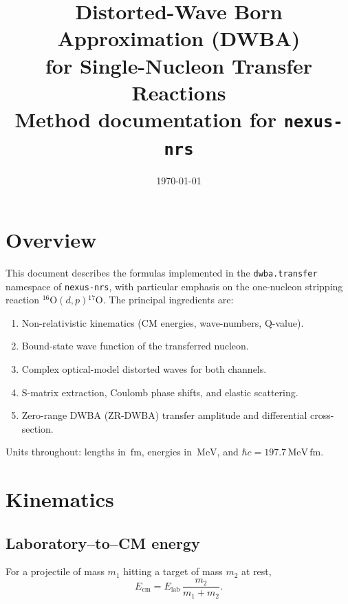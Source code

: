 \documentclass[12pt,a4paper]{article}
\title{Distorted-Wave Born Approximation (DWBA)\\
       for Single-Nucleon Transfer Reactions\\[0.5em]
       \large Method documentation for \texttt{nexus-nrs}}
\author{}
\date{\today}
\newcommand{\fm}{\,\mathrm{fm}}
\newcommand{\MeV}{\,\mathrm{MeV}}
\begin{document}
\maketitle
\tableofcontents
\newpage

\section{Overview}

This document describes the formulas implemented in the
\texttt{dwba.transfer} namespace of \texttt{nexus-nrs}, with particular
emphasis on the one-nucleon stripping reaction
${}^{16}\mathrm{O}(d,p){}^{17}\mathrm{O}$.  The principal
ingredients are:

\begin{enumerate}
  \item Non-relativistic kinematics (CM energies, wave-numbers, Q-value).
  \item Bound-state wave function of the transferred nucleon.
  \item Complex optical-model distorted waves for both channels.
  \item S-matrix extraction, Coulomb phase shifts, and elastic scattering.
  \item Zero-range DWBA (ZR-DWBA) transfer amplitude and differential
        cross-section.
\end{enumerate}

Units throughout: lengths in $\fm$, energies in $\MeV$, and
$\hbar c = 197.7\MeV\fm$.

\section{Kinematics}

\subsection{Laboratory–to–CM energy}

For a projectile of mass $m_1$ hitting a target of mass $m_2$ at rest,
\begin{equation}
  E_\mathrm{cm} = E_\mathrm{lab}\,\frac{m_2}{m_1+m_2}.
  \label{eq:lab-cm-energy}
\end{equation}
\end{document}
